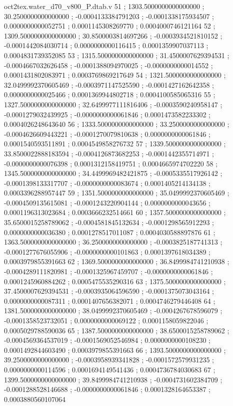 \begin{filecontents}[overwrite]{oct2tex.water_d70_v800_P.dtab.v}
51 ; 1303.5000000000000000 ; 30.2500000000000000 ; -0.0004133384791203 ; -0.0001338175934507 ; 0.0000000000052751 ; 0.0001145308269770 ; 0.0004000746121164
52 ; 1309.5000000000000000 ; 30.8500003814697266 ; -0.0003934521810152 ; -0.0001442084030714 ; 0.0000000000116415 ; 0.0001359907037113 ; 0.0004831739352085
53 ; 1315.5000000000000000 ; 31.4500007629394531 ; -0.0004667032626458 ; -0.0001388094970025 ; -0.0000000000014552 ; 0.0001431802083971 ; 0.0003769869217649
54 ; 1321.5000000000000000 ; 32.0499992370605469 ; -0.0003971147525590 ; -0.0001427162642358 ; 0.0000000000025466 ; 0.0001369944802718 ; 0.0004100585065316
55 ; 1327.5000000000000000 ; 32.6499977111816406 ; -0.0003590240958147 ; -0.0001279032439925 ; -0.0000000000061846 ; 0.0001473582233302 ; 0.0004026248643640
56 ; 1333.5000000000000000 ; 33.2500000000000000 ; -0.0004626609443221 ; -0.0001270079810638 ; 0.0000000000061846 ; 0.0001540593511891 ; 0.0004549858276732
57 ; 1339.5000000000000000 ; 33.8500022888183594 ; -0.0004126873682253 ; -0.0001442355714971 ; -0.0000000000076398 ; 0.0001312158419751 ; 0.0004665974702220
58 ; 1345.5000000000000000 ; 34.4499969482421875 ; -0.0005335517926142 ; -0.0001398133317707 ; -0.0000000000083674 ; 0.0001405214134138 ; 0.0003396288957447
59 ; 1351.5000000000000000 ; 35.0499992370605469 ; -0.0004509135615081 ; -0.0001243220904144 ; 0.0000000000043656 ; 0.0001196313023684 ; 0.0003666232514661
60 ; 1357.5000000000000000 ; 35.6500015258789062 ; -0.0004581845132634 ; -0.0001298565912293 ; 0.0000000000036380 ; 0.0001278517011087 ; 0.0004030588897876
61 ; 1363.5000000000000000 ; 36.2500000000000000 ; -0.0003825187741313 ; -0.0001277676055906 ; -0.0000000000101863 ; 0.0001397618034389 ; 0.0003979855391663
62 ; 1369.5000000000000000 ; 36.8499984741210938 ; -0.0004289111820981 ; -0.0001325967459707 ; -0.0000000000061846 ; 0.0001245960884262 ; 0.0005475535290316
63 ; 1375.5000000000000000 ; 37.4500007629394531 ; -0.0003935064596590 ; -0.0001375073043164 ; 0.0000000000087311 ; 0.0001407656382071 ; 0.0004746279446408
64 ; 1381.5000000000000000 ; 38.0499992370605469 ; -0.0004267678596079 ; -0.0001358523732051 ; 0.0000000000069122 ; 0.0001158059822046 ; 0.0005029788590036
65 ; 1387.5000000000000000 ; 38.6500015258789062 ; -0.0004569364537019 ; -0.0001569052546984 ; 0.0000000000108230 ; 0.0001492844603490 ; 0.0003979855391663
66 ; 1393.5000000000000000 ; 39.2500000000000000 ; -0.0003958939341828 ; -0.0001572579931235 ; 0.0000000000114596 ; 0.0001694149541436 ; 0.0004736784030683
67 ; 1399.5000000000000000 ; 39.8499984741210938 ; -0.0004731602384709 ; -0.0001288528146688 ; -0.0000000000061846 ; 0.0001328164653387 ; 0.0003880560107064

\end{filecontents}

